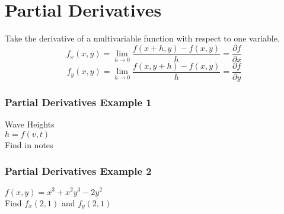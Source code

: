 \documentclass[12pt]{article}
\begin{document}
\section{Partial Derivatives}
Take the derivative of a multivariable function with respect to one variable.
\[
	f_x(x,y) = \lim_{h \to 0} \frac{f(x+h,y) - f(x,y)}{h} = \frac{\partial f}{\partial x}  
\]
\[
	f_y(x,y) = \lim_{h \to 0} \frac{f(x,y+h) - f(x,y)}{h} = \frac{\partial f}{\partial y} 
\]

\subsubsection{Partial Derivatives Example 1}
Wave Heights\\
\(h=f(v,t)\) \\
Find in notes

\subsubsection{Partial Derivatives Example 2}
\(f(x,y) = x^3 + x^2y^3 - 2y^2\) \\
Find \(f_x(2,1)\) and \(f_y(2,1)\) 
\end{document}
